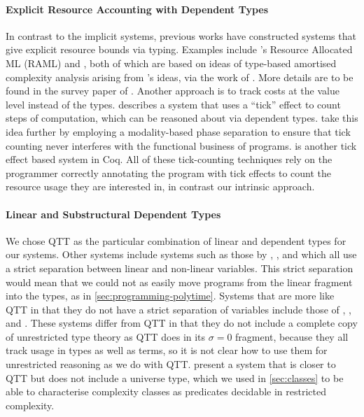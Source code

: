 \documentclass[acmsmall,screen]{acmart}
\begin{document}
\paragraph{Explicit Resource Accounting with Dependent Types} In
contrast to the implicit systems, previous works have constructed
systems that give explicit resource bounds via typing. Examples
include \citet{HoffmannDW17}'s Resource Allocated ML (RAML) and
\citet{RajaniG0021}, both of which are based on ideas of type-based
amortised complexity analysis arising from \citet{hofmann99lfpl}'s
ideas, via the work of \citet{HofmannJ03}. More details are to be
found in the survey paper of \citet{HoffmannJ22}. Another approach is
to track costs at the value level instead of the
types. \citet{Danielsson08} describes a system that uses a ``tick''
effect to count steps of computation, which can be reasoned about via
dependent types. \citet{NiuSGH22} take this idea further by employing
a modality-based phase separation to ensure that tick counting never
interferes with the functional business of
programs. \citet{McCarthyFNFF16} is another tick effect based system
in Coq. All of these tick-counting techniques rely on the programmer
correctly annotating the program with tick effects to count the
resource usage they are interested in, in contrast our intrinsic
approach.

\paragraph{Linear and Substructural Dependent Types} We chose QTT as
the particular combination of linear and dependent types for our
systems. Other systems include systems such as those by
\citet{CervesatoP02}, \citet{KrishnaswamiPB15}, and \citet{Vakar14}
which all use a strict separation between linear and non-linear
variables. This strict separation would mean that we could not as
easily move programs from the linear fragment into the types, as in
\autoref{sec:programming-polytime}. Systems that are more like QTT in
that they do not have a strict separation of variables include those
of \citet{MoonEO21}, \citet{ChoudhuryEEW21}, and \citet{Abel23}. These
systems differ from QTT in that they do not include a complete copy of
unrestricted type theory as QTT does in its $\sigma = 0$ fragment,
because they all track usage in types as well as terms, so it is not
clear how to use them for unrestricted reasoning as we do with
QTT. \citet{FuKS22} present a system that is closer to QTT but does
not include a universe type, which we used in \autoref{sec:classes} to
be able to characterise complexity classes as predicates decidable in
restricted complexity.
\end{document}
